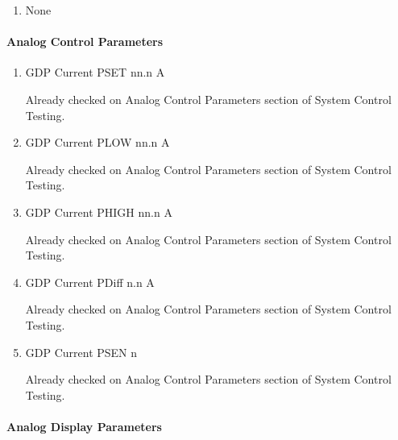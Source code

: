 \documentclass[11pt]{book}		%
\begin{document}
\begin{enumerate}
 \item None
\end{enumerate}

\paragraph{Analog Control Parameters}

\begin{enumerate}
 \item GDP Current PSET   nn.n A

\color{red}
Already checked on Analog Control Parameters section of System Control Testing.
\color{black}

 \item GDP Current PLOW   nn.n A

\color{red}
Already checked on Analog Control Parameters section of System Control Testing.
\color{black}

 \item GDP Current PHIGH  nn.n A

\color{red}
Already checked on Analog Control Parameters section of System Control Testing.
\color{black}

 \item GDP Current PDiff n.n A

\color{red}
Already checked on Analog Control Parameters section of System Control Testing.
\color{black}

 \item GDP Current PSEN  n

\color{red}
Already checked on Analog Control Parameters section of System Control Testing.
\color{black}

\end{enumerate}

\paragraph{Analog Display Parameters}
\end{document}
